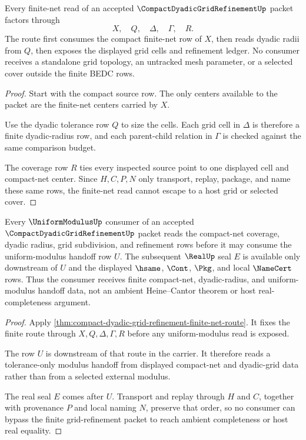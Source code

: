 \begin{theorem}
\label{thm:compact-dyadic-grid-refinement-finite-net-route}
Every finite-net read of an accepted $\CompactDyadicGridRefinementUp$ packet factors through
$$
X,\quad Q,\quad \Delta,\quad \Gamma,\quad R.
$$
The route first consumes the compact finite-net row of $X$, then reads dyadic radii from $Q$, then exposes the displayed grid cells and refinement ledger. No consumer receives a standalone grid topology, an untracked mesh parameter, or a selected cover outside the finite BEDC rows.
\end{theorem}
\begin{proof}
Start with the compact source row. The only centers available to the packet are the finite-net centers carried by $X$.

Use the dyadic tolerance row $Q$ to size the cells. Each grid cell in $\Delta$ is therefore a finite dyadic-radius row, and each parent-child relation in $\Gamma$ is checked against the same comparison budget.

The coverage row $R$ ties every inspected source point to one displayed cell and compact-net center. Since $H,C,P,N$ only transport, replay, package, and name these same rows, the finite-net read cannot escape to a host grid or selected cover.
\end{proof}

\begin{theorem}
\label{thm:compact-dyadic-grid-refinement-uniform-modulus-consumer}
Every $\UniformModulusUp$ consumer of an accepted $\CompactDyadicGridRefinementUp$ packet reads the compact-net coverage, dyadic radius, grid subdivision, and refinement rows before it may consume the uniform-modulus handoff row $U$. The subsequent $\RealUp$ seal $E$ is available only downstream of $U$ and the displayed $\hsame$, $\Cont$, $\Pkg$, and local $\NameCert$ rows. Thus the consumer receives finite compact-net, dyadic-radius, and uniform-modulus handoff data, not an ambient Heine--Cantor theorem or host real-completeness argument.
\end{theorem}
\begin{proof}
Apply \autoref{thm:compact-dyadic-grid-refinement-finite-net-route}. It fixes the finite route through $X,Q,\Delta,\Gamma,R$ before any uniform-modulus read is exposed.

The row $U$ is downstream of that route in the carrier. It therefore reads a tolerance-only modulus handoff from displayed compact-net and dyadic-grid data rather than from a selected external modulus.

The real seal $E$ comes after $U$. Transport and replay through $H$ and $C$, together with provenance $P$ and local naming $N$, preserve that order, so no consumer can bypass the finite grid-refinement packet to reach ambient completeness or host real equality.
\end{proof}

